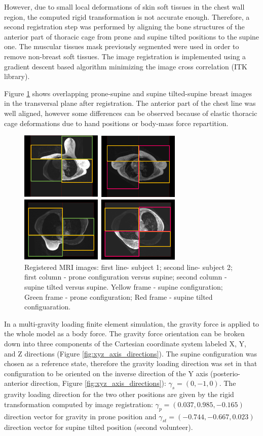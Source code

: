 However, due to small local deformations of skin soft tissues in the chest wall region, the computed rigid transformation is not accurate enough. Therefore, a second registration step was performed by aligning the bone structures of the anterior part of thoracic cage from prone and supine tilted positions to the supine one. The muscular tissues mask previously segmented were used in order to remove non-breast soft tissues. The image registration is implemented using a gradient descent based algorithm minimizing the image cross correlation (ITK library).

Figure \ref{fig:patientdataregistered} shows overlapping  prone-supine and supine tilted-supine breast images in the transversal plane after registration. The anterior part of the chest line was well aligned, however some differences can be observed because of elastic thoracic cage deformations due to hand positions or body-mass force repartition. 

\begin{figure}[!h]
\centering
\includegraphics[width=0.7\textwidth,keepaspectratio]{figures/patientDataRegistered.png} 
\caption{Registered MRI images: first line- subject 1; second line- subject 2; first column - prone configuration versus supine; second column - supine tilted versus supine. Yellow frame - supine configuration; Green frame - prone configuration; Red frame - supine tilted configuaration.}\label{fig:patientdataregistered}
\end{figure}

In a multi-gravity loading finite element simulation, the gravity force is applied to the whole model as a body force. The gravity force orientation can be broken down into three components of the Cartesian coordinate system labeled X, Y, and Z directions (Figure \ref{fig:xyz_axis_directions}). The supine configuration was chosen as a reference state, therefore the gravity loading direction was set in that configuration to be oriented on the inverse direction of the Y axis (posterio-anterior direction, Figure \ref{fig:xyz_axis_directions}): $\gamma_s = (0,-1,0)$.   The gravity loading direction for the two other positions are given by the rigid transformation computed by image registration: $\gamma_p = (0.037, 0.985, -0.165)$ direction vector for gravity in prone position and $\gamma_{st} = (-0.744 , -0.667, 0.023)$ direction vector for supine tilted position (second volunteer).

